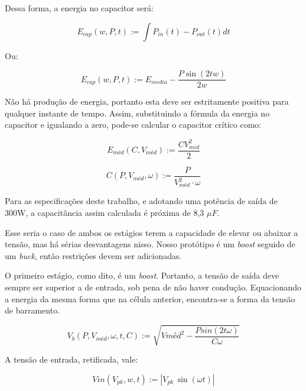 \documentclass[
        12pt,
        openany, %
        oneside, %
        a4paper,			
        english,			
        brazil
        ]{abntbibufjf}
\begin{document}
Dessa forma, a energia no capacitor será:

\begin{equation}
E_{cap}( w,P,t) := \int{P_{in}(t)-P_{out}(t)dt}
\end{equation}

Ou:

\begin{equation}
E_{cap}( w,P,t) := E_{media}-\frac{P\sin{(2tw)}}{2w}
\end{equation}

Não há produção de energia, portanto esta deve ser estritamente positiva para qualquer instante de tempo. Assim, substituindo a fórmula da energia no capacitor e igualando a zero, pode-se calcular o capacitor crítico como:

\begin{equation}
E_{méd}( C,V_{méd}) :=\frac{C V_{mid}^2}{2}
\end{equation}


\begin{equation}
C( P,V_{méd},\omega) :=\frac{P}{V_{méd}^2 \cdot \omega}
\end{equation}


Para as especificações deste trabalho, e adotando uma potência de saída de 300W, a capacitância assim calculada é próxima de 8,3 $\mu F$.


Esse seria o caso de ambos os estágios terem a capacidade de elevar ou abaixar a tensão, mas há sérias desvantagens nisso. Nosso protótipo é um \textit{boost} seguido de um \textit{buck}, então restrições devem ser adicionadas.

O primeiro estágio, como dito, é um \textit{boost}. Portanto, a tensão de saída deve sempre ser superior a de entrada, sob pena de não haver condução. Equacionando a energia da mesma forma que na célula anterior, encontra-se a forma da tensão de barramento.

\begin{equation}
V_b( P,V_{méd},\omega,t,C) :=\sqrt{ V{méd}^2 -\frac{P sin(2t\omega)}{C\omega}}
\end{equation}

A tensão de entrada, retificada, vale:

\begin{equation}
Vin( V_{pk},w,t) :=| V_{pk}\,\sin{(\omega t)}|
\end{equation}
\end{document}
